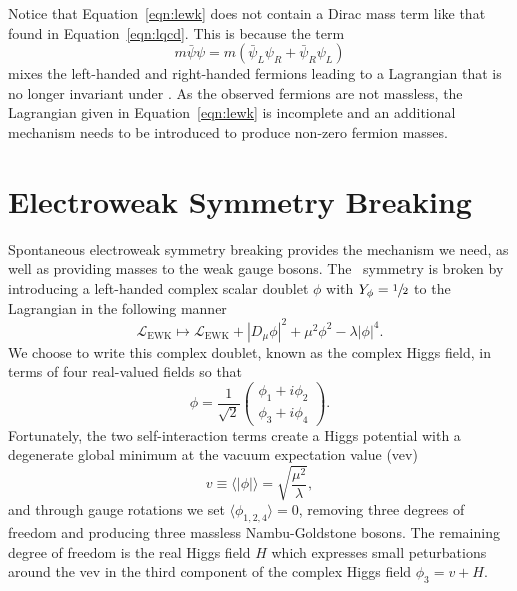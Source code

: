 Notice that Equation~\ref{eqn:lewk} does not contain a Dirac mass term like that found in Equation~\ref{eqn:lqcd}.
This is because the term
\begin{equation}
  m \bar \psi \psi = m \left( \bar \psi_L \psi_R + \bar \psi_R \psi_L \right)
\end{equation}
mixes the left-handed and right-handed fermions leading to a Lagrangian that is no longer invariant under \sutwo.
As the observed fermions are not massless, the Lagrangian given in Equation~\ref{eqn:lewk} is incomplete and an additional mechanism needs to be introduced to produce non-zero fermion masses.

\section{Electroweak Symmetry Breaking}
\label{subsec:ewsb}

Spontaneous electroweak symmetry breaking provides the mechanism we need, as well as providing masses to the weak gauge bosons. The \sutwo\ symmetry is broken by introducing a left-handed complex scalar doublet $\phi$ with $Y_\phi = \sfrac{1}{2}$ to the Lagrangian in the following manner
\begin{equation}
  \label{eqn:ewsb}
  \mathcal{L}_{\text{EWK}} \mapsto \mathcal{L}_{\text{EWK}} + \left|D_\mu \phi \right|^2 + \mu^2 \phi^2 - \lambda \left| \phi \right|^4 .
\end{equation}
We choose to write this complex doublet, known as the complex Higgs field, in terms of four real-valued fields so that
\begin{equation}
  \phi = \frac{1}{\sqrt{2}} \begin{pmatrix} \phi_1 + i \phi_2 \\ \phi_3 + i\phi_4 \end{pmatrix} .
\end{equation}
Fortunately, the two self-interaction terms create a Higgs potential with a degenerate global minimum at the vacuum expectation value (vev)
\begin{equation}
  v \equiv \langle | \phi | \rangle = \sqrt{ \frac{\mu^2}{\lambda}},
\end{equation}
and through gauge rotations we set $\langle \phi_{1,2,4} \rangle = 0$, removing three degrees of freedom and producing three massless Nambu-Goldstone bosons.
The remaining degree of freedom is the real Higgs field $H$ which expresses small peturbations around the vev in the third component of the complex Higgs field $\phi_3 = v + H$.


